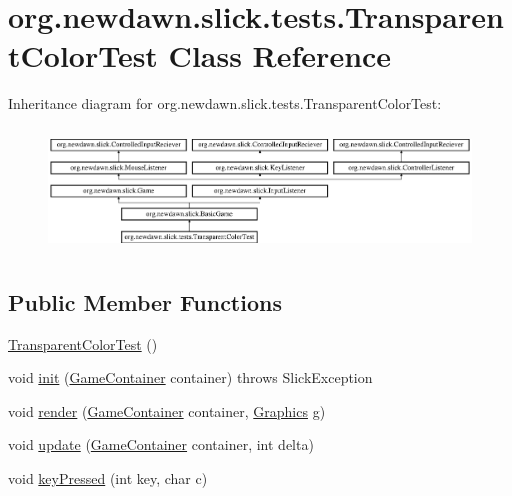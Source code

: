 \hypertarget{classorg_1_1newdawn_1_1slick_1_1tests_1_1_transparent_color_test}{}\section{org.\+newdawn.\+slick.\+tests.\+Transparent\+Color\+Test Class Reference}
\label{classorg_1_1newdawn_1_1slick_1_1tests_1_1_transparent_color_test}
Inheritance diagram for org.\+newdawn.\+slick.\+tests.\+Transparent\+Color\+Test\+:\begin{figure}[H]
\begin{center}
\leavevmode
\includegraphics[height=3.333333cm]{classorg_1_1newdawn_1_1slick_1_1tests_1_1_transparent_color_test}
\end{center}
\end{figure}
\subsection*{Public Member Functions}
\begin{DoxyCompactItemize}
\item 
\mbox{\hyperlink{classorg_1_1newdawn_1_1slick_1_1tests_1_1_transparent_color_test_a88d3d3735b2f55daa13b5be1fd29c125}{Transparent\+Color\+Test}} ()
\item 
void \mbox{\hyperlink{classorg_1_1newdawn_1_1slick_1_1tests_1_1_transparent_color_test_ab2d2d9ceff13edb0b85ba206691dda0b}{init}} (\mbox{\hyperlink{classorg_1_1newdawn_1_1slick_1_1_game_container}{Game\+Container}} container)  throws Slick\+Exception 
\item 
void \mbox{\hyperlink{classorg_1_1newdawn_1_1slick_1_1tests_1_1_transparent_color_test_a57d3cf6863b720b004dff812d8d9b89c}{render}} (\mbox{\hyperlink{classorg_1_1newdawn_1_1slick_1_1_game_container}{Game\+Container}} container, \mbox{\hyperlink{classorg_1_1newdawn_1_1slick_1_1_graphics}{Graphics}} g)
\item 
void \mbox{\hyperlink{classorg_1_1newdawn_1_1slick_1_1tests_1_1_transparent_color_test_a3b8d2635e574f5703f8fd46ec3a81944}{update}} (\mbox{\hyperlink{classorg_1_1newdawn_1_1slick_1_1_game_container}{Game\+Container}} container, int delta)
\item 
void \mbox{\hyperlink{classorg_1_1newdawn_1_1slick_1_1tests_1_1_transparent_color_test_a73793b65ffa6ebcc6309b8d169ccaa04}{key\+Pressed}} (int key, char c)
\end{DoxyCompactItemize}
